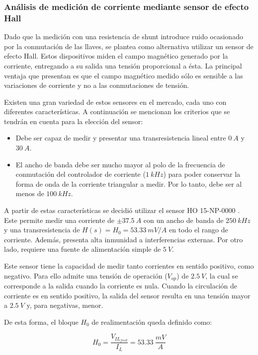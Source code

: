 \subsubsection{Análisis de medición de corriente mediante sensor de efecto Hall}

Dado que la medición con una resistencia de shunt introduce ruido ocasionado por la conmutación de las llaves, se plantea como alternativa utilizar un sensor de efecto Hall. Estos dispositivos miden el campo magnético generado por la corriente, entregando a su salida una tensión proporcional a ésta. La principal ventaja que presentan es que el campo magnético medido sólo es sensible a las variaciones de corriente y no a las conmutaciones de tensión.

Existen una gran variedad de estos sensores en el mercado, cada uno con diferentes características. A continuación se mencionan los criterios que se tendrán en cuenta para la elección del sensor:

\begin{itemize}
	\item Debe ser capaz de medir y presentar una transresistencia lineal entre $0\:A$ y $30\:A$.
	\item El ancho de banda debe ser mucho mayor al polo de la frecuencia de conmutación del controlador de corriente ($1\:kHz$) para poder conservar la forma de onda de la corriente triangular a medir. Por lo tanto, debe ser al menos de $100\:kHz$.	
\end{itemize}

A partir de estas características se decidió utilizar el sensor HO 15-NP-0000 \cite{HO15-NP}. Este permite medir una corriente de $\pm 37.5\:A$ con un ancho de banda de $250\:kHz$ y una transresistencia de $H(s)=H_0=53.33\:mV/A$ en todo  el rango de corriente. Además, presenta alta inmunidad a interferencias externas. Por otro lado, requiere una fuente de alimentación simple de $5\:V$.

Este sensor tiene la capacidad de medir tanto corrientes en sentido positivo, como negativo. Para ello admite una tensión de operación ($V_{op}$) de $2.5\:V$, la cual se corresponde a la salida cuando la corriente es nula. Cuando la circulación de corriente es en sentido positivo, la salida del sensor resulta en una tensión mayor a $2.5\:V$ y, para negativas, menor.

De esta forma, el bloque $H_0$ de realimentación queda definido como:

\begin{equation}
	H_0=\frac{V_{IL_{feed}}}{I_L}=53.33 \:\frac{mV}{A}
\end{equation}

